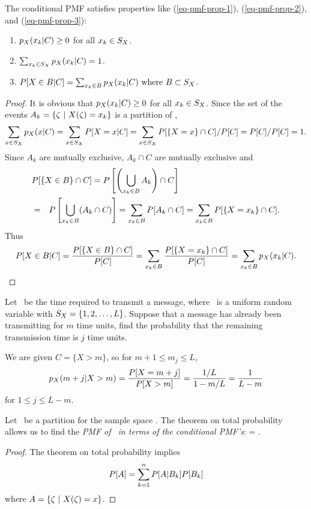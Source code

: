 	\item The conditional PMF satisfies
	properties like
	(\ref{eq-pmf-prop-1}), (\ref{eq-pmf-prop-2}), and (\ref{eq-pmf-prop-3}):
	\begin{enumerate}
		\item $ p_{X}(x_k|C) \geq 0$ for all $x_k\in S_X$.

		\item $ \sum_{x_k\in S_X} p_{X}(x_k|C) = 1$.

		\item $ P[X\in B|C]
			= \sum_{x_k \in B} p_{X}(x_k|C) \mbox{ where } B \subset S_X  $.
	\end{enumerate}
	\begin{proof}
	It is obvious that $p_{X}(x_k|C)\geq0$ for all $x_k \in S_X$.
	Since the set of the events $A_k = \{\zeta~|~X(\zeta)=x_k\}$
	is a partition of \sspace,
	\[
		\sum_{x\in S_X} p_{X}(x|C)
		= \sum_{x\in S_X} P[X=x|C]
		= \sum_{x\in S_X} P[\{X=x\}\cap C] /P[C]
		= P[C]/P[C] = 1.
	\]
	Since $A_k$ are mutually exclusive,
	$A_k \cap C$ are mutually exclusive
	and
	\begin{eqnarray*}
		\lefteqn{
		\pr{\{X\in B\}\cap C}
		= \bpr{\left(\bigcup_{x_k\in B} A_k\right) \cap C}
		}
		\\& =& \bpr{\bigcup_{x_k\in B} (A_k \cap C)}
		= \sum_{x_k \in B} \pr{A_k \cap C}
		= \sum_{x_k \in B} \pr{\{X=x_k\} \cap C}.
	\end{eqnarray*}
	Thus
	\[
		P[X\in B|C]
		= \frac{P[\{X\in B \}\cap C]}{P[C]}
		= \sum_{x_k \in B} \frac{P[\{X=x_k\} \cap C]}{P[C]}
		= \sum_{x_k \in B} p_{X}(x_k|C).
	\]
	\end{proof}


	\item {}
	Let \X\ be the time required to transmit a message,
	where \X\ is a uniform random variable with $S_X = \{1, 2, \ldots, L\}$.
	Suppose that a message has already been transmitting for $m$ time units,
	find the probability that the remaining transmission time is $j$ time units.

	We are given $C = \{X>m\}$, so for $m+1\leq m_j\leq L$,
	\[
		p_{X}(m+j|X>m) = \frac{P[X=m+j]}{P[X>m]}
		= \frac{1/L}{1-m/L} = \frac{1}{L-m}
	\]
	for $1\leq j\leq L-m$.

	\item
	Let \ be a partition for the sample space \sspace.
	The theorem on total probability allows us
	to find the \emph{PMF of \X\ in terms of the conditional PMF's}:
		 = \sumiton {} .
	\eeql
	\begin{proof}
		The theorem on total probability implies
		\[
			P[A] = \sum_{k=1}^{n} P[A|B_k]P[B_k]
		\]
		where $A = \{\zeta~|~X(\zeta)=x\}$.
	\end{proof}

